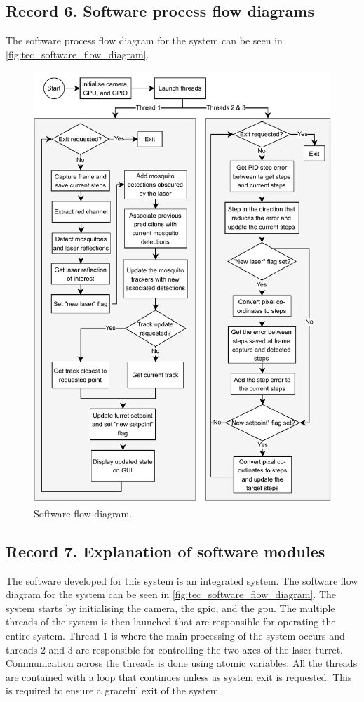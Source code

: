 \subsection{Record 6. Software process flow diagrams}
The software process flow diagram for the system can be seen in \autoref{fig:tec_software_flow_diagram}.
\newpage
\begin{figure}[H]
  \centering
  \includegraphics[width=\textwidth, height=\textheight, keepaspectratio]{figures/software_flow_diagram.pdf}
  \caption{Software flow diagram.}
  \label{fig:tec_software_flow_diagram}
\end{figure}

\newpage
\subsection{Record 7. Explanation of software modules}
The software developed for this system is an integrated system. The software flow diagram for the system can be seen in \autoref{fig:tec_software_flow_diagram}. The system starts by initialising the camera, the \gls{gpio}, and the \gls{gpu}. The multiple threads of the system is then launched that are responsible for operating the entire system. Thread 1 is where the main processing of the system occurs and threads 2 and 3 are responsible for controlling the two axes of the laser turret. Communication across the threads is done using atomic variables. All the threads are contained with a loop that continues unless as system exit is requested. This is required to ensure a graceful exit of the system.

